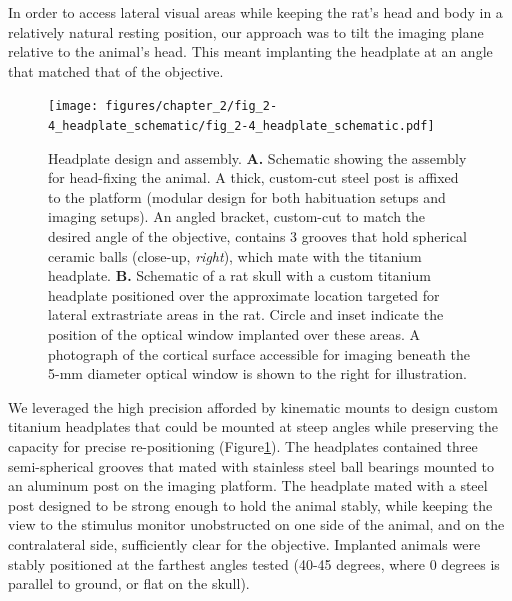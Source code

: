 In order to access lateral visual areas while keeping the rat’s head and body in a relatively natural resting position, our approach was to tilt the imaging plane relative to the animal’s head. This meant implanting the headplate at an angle that matched that of the objective. 

\begin{figure}
    \texttt{[image: figures/chapter\_2/fig\_2-4\_headplate\_schematic/fig\_2-4\_headplate\_schematic.pdf]}
    \vspace{.1in}
    \caption[Headplate design and assembly]{Headplate design and assembly. \textbf{A.} Schematic showing the assembly for head-fixing the animal. A thick, custom-cut steel post is affixed to the platform (modular design for both habituation setups and imaging setups). An angled bracket, custom-cut to match the desired angle of the objective, contains 3 grooves that hold spherical ceramic balls (close-up, \textit{right}), which mate with the titanium headplate. \textbf{B.} Schematic of a rat skull with a custom titanium headplate positioned over the approximate location targeted for lateral extrastriate areas in the rat. Circle and inset indicate the position of the optical window implanted over these areas. A photograph of the cortical surface accessible for imaging beneath the 5-mm diameter optical window is shown to the right for illustration. 
    \label{fig:headplate_schematic}}
\end{figure}

We leveraged the high precision afforded by kinematic mounts to design custom titanium headplates that could be mounted at steep angles while preserving the capacity for precise re-positioning (Figure\ref{fig:headplate_schematic}). The headplates contained three semi-spherical grooves that mated with stainless steel ball bearings mounted to an aluminum post on the imaging platform. The headplate mated with a steel post designed to be strong enough to hold the animal stably, while keeping the view to the stimulus monitor unobstructed on one side of the animal, and on the contralateral side, sufficiently clear for the objective. Implanted animals were stably positioned at the farthest angles tested (40-45 degrees, where 0 degrees is parallel to ground, or flat on the skull).  

